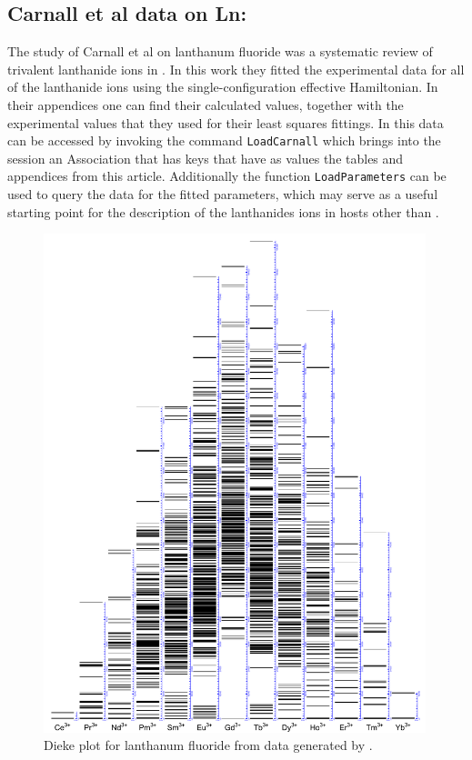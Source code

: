 \documentclass{article}
\newcommand{\codetext}[1]{{\color{BlueViolet} \texttt{#1}}}
\begin{document}
\subsection{Carnall et al data on Ln:\LaFthree}

The study of Carnall et al \cite{carnall_systematic_1989} on lanthanum fluoride was a systematic review of trivalent lanthanide ions in \LaFthree. In this work they fitted the experimental data for all of the lanthanide ions using the single-configuration effective Hamiltonian. In their appendices one can find their calculated values, together with the experimental values that they used for their least squares fittings. In \qlanth this data can be accessed by invoking the command \codetext{LoadCarnall} which brings into the session an Association that has keys that have as values the tables and appendices from this article. Additionally the function \codetext{LoadParameters} can be used to query the data for the fitted parameters, which may serve as a useful starting point for the description of the lanthanides ions in hosts other than \LaFthree.

\begin{figure}[htb!]
\begin{center}
	\includegraphics[width=0.99\textwidth]{DiekePlot.pdf}
\end{center}
\caption{Dieke plot for lanthanum fluoride from data generated by \qlanth.}
\end{figure}
\end{document}
